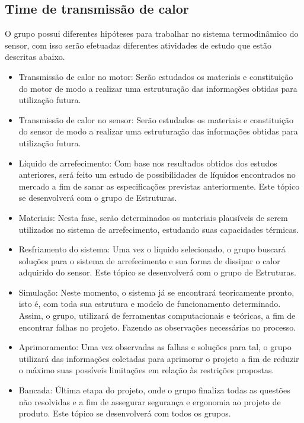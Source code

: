 \subsection{Time de transmissão de calor}

O grupo possui diferentes hipóteses para trabalhar no sistema termodinâmico do sensor, com isso serão efetuadas diferentes atividades de estudo que estão descritas abaixo.

\begin{itemize}
\item Transmissão de calor no motor: Serão estudados os materiais e constituição do motor de modo a realizar uma estruturação das informações obtidas para utilização futura.
\item Transmissão de calor no sensor: Serão estudados os materiais e constituição do sensor de modo a realizar uma estruturação das informações obtidas para utilização futura.
\item Líquido de arrefecimento: Com base nos resultados obtidos dos estudos anteriores, será feito um estudo de possibilidades de líquidos encontrados no mercado a fim de sanar as especificações previstas anteriormente. Este tópico se desenvolverá com o grupo de Estruturas.
\item Materiais: Nesta fase, serão determinados os materiais plausíveis de serem utilizados no sistema de arrefecimento, estudando suas capacidades térmicas.
\item Resfriamento do sistema: Uma vez o líquido selecionado, o grupo buscará soluções para o sistema de arrefecimento e sua forma de dissipar o calor adquirido do sensor. Este tópico se desenvolverá com o grupo de Estruturas.
\item Simulação: Neste momento, o sistema já se encontrará teoricamente pronto, isto é, com toda sua estrutura e modelo de funcionamento determinado. Assim, o grupo, utilizará de ferramentas computacionais e teóricas, a fim de encontrar falhas no projeto. Fazendo as observações necessárias no processo.
\item Aprimoramento: Uma vez observadas as falhas e soluções para tal, o grupo utilizará das informações coletadas para aprimorar o projeto a fim de reduzir o máximo suas possíveis limitações em relação às restrições propostas.
\item Bancada: Última etapa do projeto, onde o grupo finaliza todas as questões não resolvidas e a fim de assegurar segurança e ergonomia ao projeto de produto. Este tópico se desenvolverá com todos os grupos.

\end{itemize}

